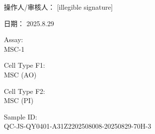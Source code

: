 \documentclass[UTF8,10pt,a4paper,fontset=fandol]{ctexart}
\newcommand{\fieldvalue}[1]{#1}
\newcommand{\handwritten}[1]{#1}
\begin{document}
\bigskip

\noindent
\begin{minipage}[t]{0.47\textwidth}
\centering
\fbox{\rule{0pt}{0.22\textheight}\rule{0.95\linewidth}{0pt}}
\end{minipage}
\hfill
\begin{minipage}[t]{0.47\textwidth}
\centering
\fbox{\rule{0pt}{0.22\textheight}\rule{0.95\linewidth}{0pt}}
\end{minipage}

\medskip

\noindent
\begin{minipage}[t]{0.47\textwidth}
\centering
\fbox{\rule{0pt}{0.22\textheight}\rule{0.95\linewidth}{0pt}}
\end{minipage}
\hfill
\begin{minipage}[t]{0.47\textwidth}
\centering
\fbox{\rule{0pt}{0.22\textheight}\rule{0.95\linewidth}{0pt}}
\end{minipage}

\bigskip

\noindent 操作人/审核人：
\fieldvalue{\handwritten{[illegible signature]}}

\hfill
日期：
\fieldvalue{\handwritten{2025.8.29}}

\newpage

\noindent Assay: \\
\fieldvalue{MSC-1}

\medskip
\noindent Cell Type F1: \\
\fieldvalue{MSC (AO)}

\noindent Cell Type F2: \\
\fieldvalue{MSC (PI)}

\medskip
\noindent Sample ID: \\
\fieldvalue{QC-JS-QY0401-A31Z2202508008-20250829-70H-3}
\end{document}
